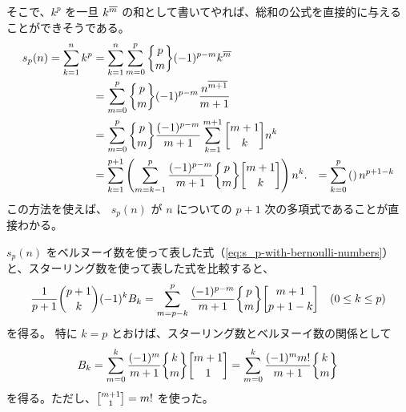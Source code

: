 {そこで、$k^p$ を一旦 ${k}^{\overline{m}}$ の和として書いてやれば、総和の公式を直接的に与えることができそうである。
\begin{align*}
  s_p(n)=\sum_{k=1}^n k^p
  &=\sum_{k=1}^n \sum_{m=0}^p \stirlingII{p}{m}(-1)^{p-m} \risingFactorial{k}{m} \\
  &=\sum_{m=0}^p \stirlingII{p}{m}(-1)^{p-m} \frac{\risingFactorial{n}{m+1}}{m+1} \\
  &=\sum_{m=0}^p \stirlingII{p}{m}\frac{(-1)^{p-m}}{m+1} \sum_{k=1}^{m+1} \stirlingI{m+1}{k} n^k \\
  &=\sum_{k=1}^{p+1} \left(\sum_{m=k-1}^p \frac{(-1)^{p-m}}{m+1} \stirlingII{p}{m} \stirlingI{m+1}{k}\right) n^k.
  &=\sum_{k=0}^{p} \left(\right) n^{p+1-k}
\end{align*}
この方法を使えば、 $s_p(n)$ が $n$ についての $p+1$ 次の多項式であることが直接わかる。

$s_p(n)$ をベルヌーイ数を使って表した式（\autoref{eq:s_p-with-bernoulli-numbers}）と、スターリング数を使って表した式を比較すると、
\[
  \frac{1}{p+1} \binom{p+1}{k} (-1)^{k} B_{k}
  =\sum_{m=p-k}^p \frac{(-1)^{p-m}}{m+1} \stirlingII{p}{m} \stirlingI{m+1}{p+1-k}
  \quad (0\le k\le p)
\]
を得る。
特に $k=p$ とおけば、スターリング数とベルヌーイ数の関係として
\begin{equation*}
  B_k
  =\sum_{m=0}^k \frac{(-1)^{m}}{m+1} \stirlingII{k}{m} \stirlingI{m+1}{1}
  =\sum_{m=0}^k \frac{(-1)^{m}m!}{m+1} \stirlingII{k}{m}
\end{equation*}
を得る。ただし、$\stirlingI{m+1}{1}=m!$ を使った。


}
